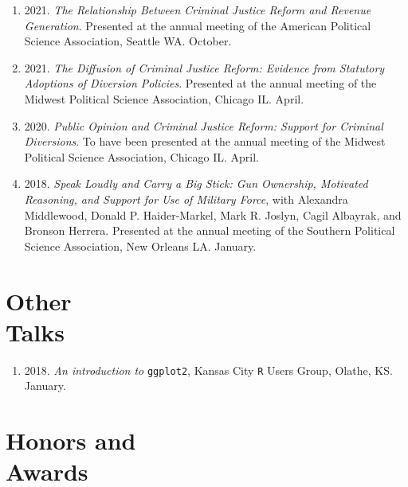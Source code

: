 \documentclass[margin,line,pifont,palatino,courier]{res}
\begin{document}
\begin{resume}
\begin{enumerate}

\item 2021. \emph{The Relationship Between Criminal Justice Reform and
    Revenue Generation}. Presented at the annual meeting of the
  American Political Science Association, Seattle WA. October.

\item 2021. \emph{The Diffusion of Criminal Justice Reform: Evidence
    from Statutory Adoptions of Diversion Policies}. Presented at
  the annual meeting of the Midwest Political Science Association,
  Chicago IL. April.

\item 2020. \emph{Public Opinion and Criminal Justice Reform: Support for
  Criminal Diversions}. To have been presented at the annual meeting of
the Midwest Political Science Association, Chicago IL. April.

\item 2018. \emph{Speak Loudly and Carry a Big Stick: Gun Ownership, Motivated
  Reasoning, and Support for Use of Military Force}, with Alexandra
Middlewood, Donald P. Haider-Markel, Mark R. Joslyn, Cagil Albayrak,
and Bronson Herrera. Presented at the annual meeting of the Southern
Political Science Association, New Orleans LA. January.
\end{enumerate}

\section{\sc Other\\ Talks}

\begin{enumerate}
\item 2018. \emph{An introduction to} \verb+ggplot2+, Kansas City \verb+R+ Users Group,
Olathe, KS. January.
\end{enumerate}


\section{\sc Honors and\\ Awards}


\end{resume}
\end{document}
